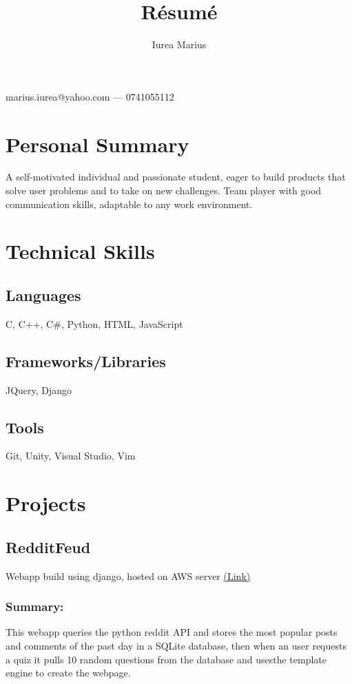\documentclass[a4paper,hidelinks,10pt]{article}
\begin{document}
\title{R\'esum\'e}
\author{Iurea Marius}
\renewcommand{\maketitle}
{
        \begin{center}
        {\huge\bfseries
        \thetitle

        \theauthor}

        marius.iurea@yahoo.com --- 0741055112

        \end{center}
}

\maketitle

\section{Personal Summary}
A self-motivated individual and passionate student, eager to build products that solve user problems and to take on new challenges.
Team player with good communication skills, adaptable to any work environment.
\section{Technical Skills}
\subsection{Languages}
C, C++, C\#, Python, HTML, JavaScript
\subsection{Frameworks/Libraries}
JQuery, Django
\subsection{Tools}
Git, Unity, Visual Studio, Vim
\section{Projects}
\subsection{RedditFeud}
Webapp build using django, hosted on AWS server \href{https:\\www.redditfeud.com}{(Link)}
\subsubsection{Summary:}
This webapp queries the python reddit API and stores the most popular posts and comments of the past day
in a SQLite database, then when an user requests a quiz it pulls 10 random questions from the database and usesthe template engine to create the webpage.
\end{document}

